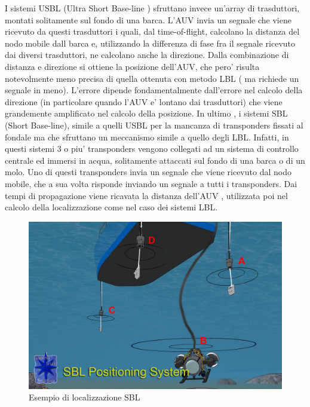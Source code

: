I sistemi USBL (Ultra Short Base-line ) sfruttano invece un'array di trasduttori, montati solitamente sul fondo di una barca. \newline L'AUV invia un segnale che viene ricevuto da questi trasduttori i quali, dal time-of-flight, calcolano la distanza del nodo mobile dall barca e, utilizzando la differenza di fase fra il segnale ricevuto dai diversi trasduttori, ne calcolano anche la direzione. \newline Dalla combinazione di distanza e direzione si ottiene la posizione dell'AUV, che pero' risulta notevolmente meno precisa di quella ottenuta con metodo LBL ( ma richiede un segnale in meno). \newline L'errore dipende fondamentalmente dall'errore nel calcolo della direzione (in particolare quando l'AUV e' lontano dai trasduttori) che viene grandemente amplificato nel calcolo della posizione. \newline
In ultimo , i sistemi SBL (Short Base-line), simile a quelli USBL per la mancanza di transponders fissati al fondale ma che sfruttano un meccanismo simile a quello degli LBL. \newline Infatti, in questi sistemi 3 o piu' transponders vengono collegati ad un sistema di controllo centrale ed immersi in acqua, solitamente attaccati sul fondo di una barca o di un molo. \newline Uno di questi transponders invia un segnale che viene ricevuto dal nodo mobile, che a sua volta risponde inviando un segnale a tutti i transponders. \newline Dai tempi di propagazione viene ricavata la distanza dell'AUV , utilizzata poi nel calcolo della localizzazione come nel caso dei sistemi LBL.

\begin{figure}[H]
	\centering
	\includegraphics[scale=0.25]{SBL.jpg}
	\caption{ Esempio di localizzazione SBL}
	\label{fig:SBL}
\end{figure}



